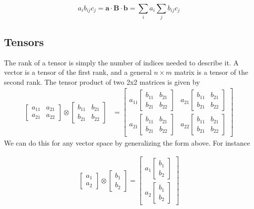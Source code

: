 $$a_i b_{ij} c_j = \textbf{a}\cdot\textbf{B}\cdot\textbf{b} = \sum_{i} a_i \sum_{j} b_{ij} c_j$$

\subsection{Tensors}
The rank of a tensor is simply the number of indices needed to describe it. A vector is a tensor of the first rank, and a general $n \times m$ matrix is a tensor of the second rank. The tensor product of two 2x2 matrices is given by
\begin{align}
\begin{bmatrix}
a_{11} & a_{21} \\
a_{21} & a_{22}
\end{bmatrix}
\otimes
\begin{bmatrix}
b_{11} & b_{21} \\
b_{21} & b_{22}
\end{bmatrix} &=
\begin{bmatrix}
a_{11} \begin{bmatrix}
b_{11} & b_{21} \\
b_{21} & b_{22}
\end{bmatrix}& a_{21} \begin{bmatrix}
b_{11} & b_{21} \\
b_{21} & b_{22}
\end{bmatrix}\\
a_{21} \begin{bmatrix}
b_{11} & b_{21} \\
b_{21} & b_{22}
\end{bmatrix}& a_{22}\begin{bmatrix}
b_{11} & b_{21} \\
b_{21} & b_{22}
\end{bmatrix}
\end{bmatrix}
\end{align}
We can do this for any vector space by generalizing the form above. For instance

\begin{align}
\begin{bmatrix}
a_{1}  \\
a_{2} 
\end{bmatrix}
\otimes
\begin{bmatrix}
b_{1}\\
b_{2}
\end{bmatrix} = 
\begin{bmatrix}
a_{1}  \begin{bmatrix}
b_{1}\\
b_{2}
\end{bmatrix} \\
a_{2} \begin{bmatrix}
b_{1}\\
b_{2}
\end{bmatrix} 
\end{bmatrix}
\end{align}

